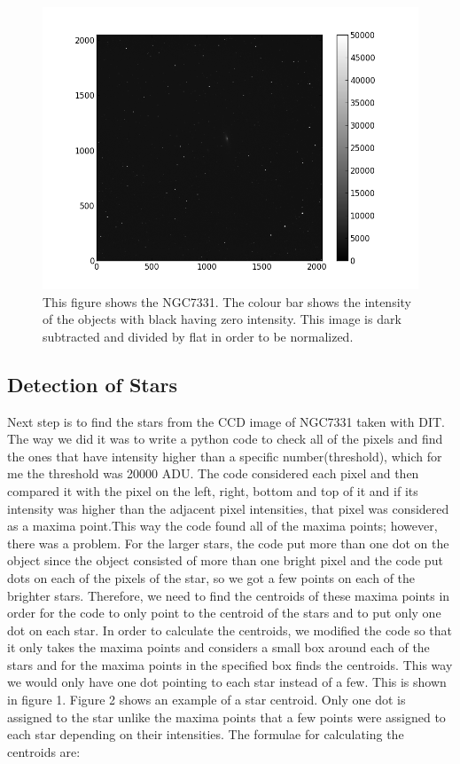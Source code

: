 \documentclass[letterpaper,12pt]{article}
\begin{document}
\FloatBarrier
\begin{figure}[h!]
\entering
\includegraphics[scale=0.6]{ngc7331.png}
\caption{This figure shows the NGC7331. The colour bar shows the intensity of the objects with black having zero intensity. This image is dark subtracted and divided by flat in order to be normalized.}
\end{figure}
\FloatBarrier


\subsection{Detection of Stars}
Next step is to find the stars from the CCD image of NGC7331 taken with DIT. The way we did it was to write a python code to check all of the pixels and find the ones that have intensity higher than a specific number(threshold), which for me the threshold was 20000 ADU. The code considered each pixel and then compared it with the pixel on the left, right, bottom and top of it and if its intensity was higher than the adjacent pixel intensities, that pixel was considered as a maxima point.This way the code found all of the maxima points; however, there was a problem. For the larger stars, the code put more than one dot on the object since the object consisted of more than one bright pixel and the code put dots on each of the pixels of the star, so we got a few points on each of the brighter stars. Therefore, we need to find the centroids of these maxima points in order for the code to only point to the centroid of the stars and to put only one dot on each star. In order to calculate the centroids, we modified the code so that it only takes the maxima points and considers a small box around each of the stars and for the maxima points in the specified box finds the centroids. This way we would only have one dot pointing to each star instead of a few. This is shown in figure 1. Figure 2 shows an example of a star centroid. Only one dot is assigned to the star unlike the maxima points that a few points were assigned to each star depending on their intensities.
The formulae for calculating the centroids are:
\end{document}

